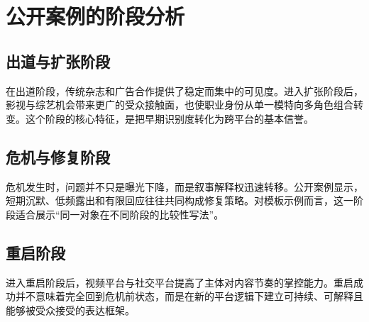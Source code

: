 \chapter{公开案例的阶段分析}

\section{出道与扩张阶段}

在出道阶段，传统杂志和广告合作提供了稳定而集中的可见度。进入扩张阶段后，影视与综艺机会带来更广的受众接触面，也使职业身份从单一模特向多角色组合转变。这个阶段的核心特征，是把早期识别度转化为跨平台的基本信誉。

\section{危机与修复阶段}

危机发生时，问题并不只是曝光下降，而是叙事解释权迅速转移。公开案例显示，短期沉默、低频露出和有限回应往往共同构成修复策略。对模板示例而言，这一阶段适合展示“同一对象在不同阶段的比较性写法”。

\section{重启阶段}

进入重启阶段后，视频平台与社交平台提高了主体对内容节奏的掌控能力。重启成功并不意味着完全回到危机前状态，而是在新的平台逻辑下建立可持续、可解释且能够被受众接受的表达框架。
